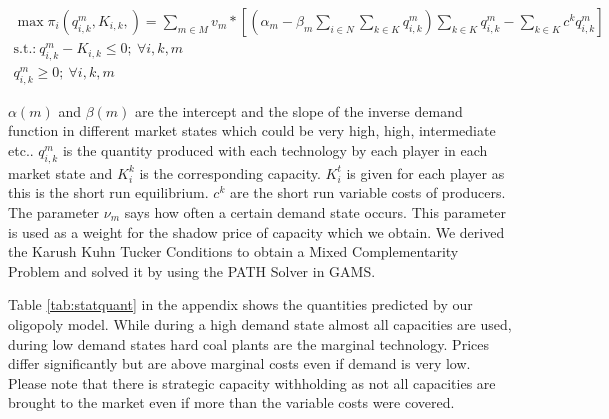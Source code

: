 \begin{gather}
	\max \pi_i(q_{i,k}^m,K_{i,k},)= \sum_{m\in M} v_m * \left[(\alpha_m-\beta_m\sum_{i\in N} \sum_{k\in K} q_{i,k}^m ) \sum_{k\in K} q_{i,k}^m - \sum_{k\in K} c^k q_{i,k}^m \right] \\
			\text{s.t.:} \  q_{i,k}^m-K_{i,k} \leq 0;\  \forall i,k,m \\  \nonumber
 										  q_{i,k}^m	\geq 0; \ \forall i,k,m   \nonumber
\end{gather}

$\alpha(m)$ and $\beta(m)$ are the intercept and the slope of the inverse demand function in different market states which could be very high, high, intermediate etc.. $q_{i,k}^m$ is the quantity produced with each technology by each player in each market state and $K_i^k$ is the corresponding capacity. $K_i^t$ is given for each player as this is the short run equilibrium. $c^k$ are the short run variable costs of producers. The parameter $\nu_m $ says how often a certain demand state occurs. This parameter is used as a weight for the shadow price of capacity which we obtain. We derived the Karush Kuhn Tucker Conditions to obtain a Mixed Complementarity Problem and solved it by using the PATH Solver in GAMS.

Table \ref{tab:statquant} in the appendix shows the quantities predicted by our oligopoly model. While during a high demand state almost all capacities are used, during low demand states hard coal plants are the marginal technology. Prices differ significantly but are above marginal costs even if demand is very low. Please note that there is strategic capacity withholding as not all capacities are brought to the market even if more than the variable costs were covered.

